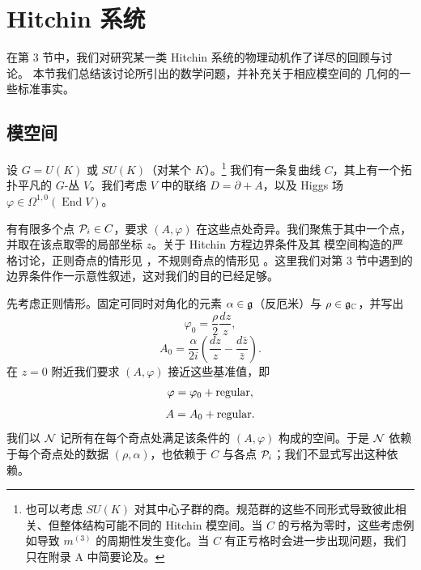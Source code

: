 \section{Hitchin 系统}\label{sec:hitchin}

在第 3 节中，我们对研究某一类 Hitchin 系统的物理动机作了详尽的回顾与讨论。%
本节我们总结该讨论所引出的数学问题，并补充关于相应模空间的 \hk 几何的一些标准事实。

\subsection{模空间}

设 $G = U(K)$ 或 $SU(K)$（对某个 $K$）。\footnote{也可以考虑 $SU(K)$ 对其中心子群的商。规范群的这些不同形式导致彼此相关、但整体结构可能不同的 Hitchin 模空间。当 $C$ 的亏格为零时，这些考虑例如导致 $m^{(3)}$ 的周期性发生变化。当 $C$ 有正亏格时会进一步出现问题，我们只在附录 A 中简要论及。}
我们有一条复曲线 $C$，其上有一个拓扑平凡的 $G$-丛 $V$。我们考虑 $V$ 中的联络 $D = \partial + A$，以及 Higgs 场 $\varphi \in \Omega^{1,0}(\operatorname{End} V)$。

有有限多个点 $\mathcal{P}_i \in C$，要求 $(A, \varphi)$ 在这些点处奇异。我们聚焦于其中一个点，并取在该点取零的局部坐标 $z$。关于 Hitchin 方程边界条件及其 \hk 模空间构造的严格讨论，正则奇点的情形见 \cite{MR1206652,MR1397988}，不规则奇点的情形见 \cite{wnh}。这里我们对第 3 节中遇到的边界条件作一示意性叙述，这对我们的目的已经足够。

先考虑正则情形。固定可同时对角化的元素 $\alpha \in {\mathfrak{g}}$（反厄米）与 $\rho \in {\mathfrak{g}}_{\mathbb{C}}$，并写出
\begin{equation}
\varphi_0 = \frac{\rho}{2} \frac{dz}{z}, \label{eq:reg-sing-bc-1}
\end{equation}
\begin{equation}
A_0 = \frac{\alpha}{2i} \left( \frac{dz}{z} - \frac{d\bar z}{\bar z} \right). \label{eq:reg-sing-bc-2}
\end{equation}
在 $z = 0$ 附近我们要求 $(A, \varphi)$ 接近这些基准值，即
\begin{equation}\label{eq:SingConnBc1}
\varphi = \varphi_0 + {\rm regular},
\end{equation}
\begin{equation}\label{eq:SingConnBc2}
A = A_0 + {\rm regular}.
\end{equation}
我们以 $\mathcal{N}$ 记所有在每个奇点处满足该条件的 $(A, \varphi)$ 构成的空间。于是 $\mathcal{N}$ 依赖于每个奇点处的数据 $(\rho,\alpha)$，也依赖于 $C$ 与各点 $\mathcal{P}_i$；我们不显式写出这种依赖。

